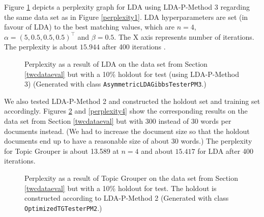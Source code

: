 \documentclass[10pt, a4paper, oneside]{article}
\begin{document}
Figure \ref{perplexity2} depicts a perplexity graph for LDA using LDA-P-Method 3 regarding the same data set as in Figure \ref{perplexity1}. LDA hyperparameters are set (in favour of LDA) to the best matching values, which are $n = 4$, $\alpha = (5, 0.5, 0.5, 0.5)^\top$ and $\beta=0.5$. The X axis represents number of iterations. The perplexity is about $15.944$ after 400 iterations .

\begin{figure}
\caption{Perplexity as a result of LDA on the data set from Section \ref{twcdataeval} but with a 10\% holdout for test (using LDA-P-Method 3) (Generated with class \texttt{AsymmetricLDAGibbsTesterPM3}.)}
\label{perplexity2}
\end{figure}

We also tested LDA-P-Method 2 and constructed the holdout set and training set accordingly. Figures \ref{perplexity3} and \ref{perplexity4} show the corresponding results on the data set from Section \ref{twcdataeval} but with 300 instead of 30 words per documents instead. (We had to increase the document size so that the holdout documents end up to have a reasonable size of about 30 words.) The perplexity for Topic Grouper is about 13.589 at $n = 4$ and about $15.417$ for LDA after 400 iterations.

\begin{figure}
\caption{Perplexity as a result of Topic Grouper on the data set from Section \ref{twcdataeval} but with a 10\% holdout for test. The holdout is constructed according to LDA-P-Method 2 (Generated with class \texttt{OptimizedTGTesterPM2}.)}
\label{perplexity3}
\end{figure}
\end{document}
